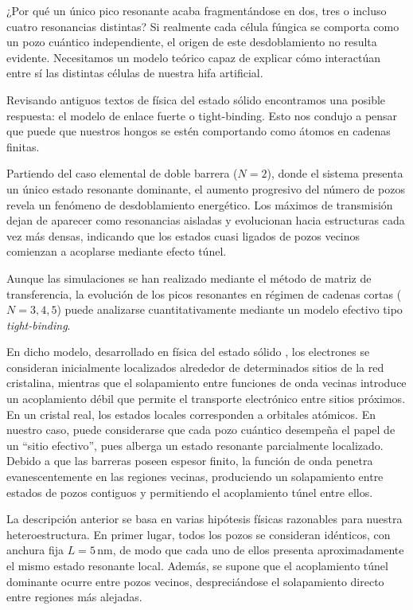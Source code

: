 \documentclass[a4paper,12pt]{article}
\begin{document}
¿Por qué un único pico resonante acaba fragmentándose en dos, tres o incluso cuatro resonancias distintas? Si realmente cada célula fúngica se comporta como un pozo cuántico independiente, el origen de este desdoblamiento no resulta evidente. Necesitamos un modelo teórico capaz de explicar cómo interactúan entre sí las distintas células de nuestra hifa artificial.

Revisando antiguos textos de física del estado sólido encontramos una posible respuesta: el modelo de enlace fuerte o tight-binding. Esto nos condujo a pensar que puede que nuestros hongos se estén comportando como átomos en cadenas finitas.

Partiendo del caso elemental de doble barrera ($N=2$), donde el sistema presenta un único estado resonante dominante, el aumento progresivo del número de pozos revela un fenómeno de desdoblamiento energético. Los máximos de transmisión dejan de aparecer como resonancias aisladas y evolucionan hacia estructuras cada vez más densas, indicando que los estados cuasi ligados de pozos vecinos comienzan a acoplarse mediante efecto túnel.

Aunque las simulaciones se han realizado mediante el método de matriz de transferencia, la evolución de los picos resonantes en régimen de cadenas cortas ($N=3,4,5$) puede analizarse cuantitativamente mediante un modelo efectivo tipo \textit{tight-binding}.

En dicho modelo, desarrollado en física del estado sólido \cite{kittel2005}, los electrones se consideran inicialmente localizados alrededor de determinados sitios de la red cristalina, mientras que el solapamiento entre funciones de onda vecinas introduce un acoplamiento débil que permite el transporte electrónico entre sitios próximos. En un cristal real, los estados locales corresponden a orbitales atómicos. En nuestro caso, puede considerarse que cada pozo cuántico desempeña el papel de un ``sitio efectivo'', pues alberga un estado resonante parcialmente localizado. Debido a que las barreras poseen espesor finito, la función de onda penetra evanescentemente en las regiones vecinas, produciendo un solapamiento entre estados de pozos contiguos y permitiendo el acoplamiento túnel entre ellos.

La descripción anterior se basa en varias hipótesis físicas razonables para nuestra heteroestructura. En primer lugar, todos los pozos se consideran idénticos, con anchura fija $L=5\,\mathrm{nm}$, de modo que cada uno de ellos presenta aproximadamente el mismo estado resonante local. Además, se supone que el acoplamiento túnel dominante ocurre entre pozos vecinos, despreciándose el solapamiento directo entre regiones más alejadas.
\end{document}
